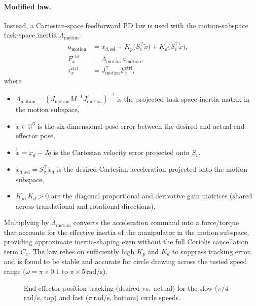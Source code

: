 \documentclass[
	german,%
	accentcolor=9c,%
	ruledheaders=section,%
	class=report,%
	thesis={type=bachelor},%
	fontsize=11pt,%
	parskip=half-,%
	custommargins=true,%
	marginpar=false,%
]{tudapub}
\begin{document}
\paragraph{Modified law.}
Instead, a Cartesian-space feedforward PD law is used with the motion-subspace
task-space inertia \(\Lambda_\text{motion}\):
\begin{align}
    a_\text{motion}
        &= \ddot{x}_{d,\text{sel}}
           + K_p \bigl(S_v^\top \tilde{x}\bigr)
           + K_d \bigl(S_v^\top \dot{\tilde{x}}\bigr),
           \label{eq:motion_acc} \\
    F^\text{ctrl}_x
        &= \Lambda_\text{motion}\,a_\text{motion},
           \label{eq:motion_force} \\
    \tau^\text{ctrl}_x
        &= J_\text{motion}^\top F^\text{ctrl}_x,
           \label{eq:motion_torque}
\end{align}
where
\begin{itemize}
    \item \(\Lambda_\text{motion} = (J_\text{motion} M^{-1} J_\text{motion}^\top)^{-1}\)
          is the projected task-space inertia matrix in the motion subspace,
    \item \(\tilde{x} \in \mathbb{R}^6\) is the six-dimensional pose error
          between the desired and actual end-effector pose,
    \item \(\dot{\tilde{x}} = \dot{x}_d - J\dot{q}\) is the Cartesian velocity
          error projected onto \(S_v\),
    \item \(\ddot{x}_{d,\text{sel}} = S_v^\top \ddot{x}_d\) is the desired
          Cartesian acceleration projected onto the motion subspace,
    \item \(K_p, K_d > 0\) are the diagonal proportional and derivative gain
          matrices (shared across translational and rotational directions).
\end{itemize}

Multiplying by \(\Lambda_\text{motion}\) converts the acceleration command
into a force/torque that accounts for the effective inertia of the manipulator
in the motion subspace, providing approximate inertia-shaping even without the
full Coriolis cancellation term \(C_x\).
The law relies on sufficiently high \(K_p\) and \(K_d\) to suppress
tracking error, and is found to be stable and accurate for circle drawing
across the tested speed range (\(\omega = \pi \times 0.1\) to
\(\pi \times 5\,\mathrm{rad/s}\)).

\begin{figure}[htbp]
    \centering
    \caption{End-effector position tracking (desired vs.\ actual) for the
             slow ($\pi/4$\,rad/s, top) and fast ($\pi$\,rad/s, bottom)
             circle speeds.}
    \label{fig:ee_position_tracking}
\end{figure}
\end{document}
